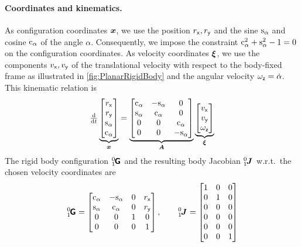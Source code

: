 \paragraph{Coordinates and kinematics.}
As configuration coordinates $\boldsymbol{x}$, we use the position $r_{\mathsf{x}},r_{\mathsf{y}}$ and the sine $\mathrm{s}_{\alpha}$ and cosine $\mathrm{c}_{\alpha}$ of the angle $\alpha$.
Consequently, we impose the constraint $\mathrm{c}_{\alpha}^2+\mathrm{s}_{\alpha}^2-1 = 0$ on the configuration coordinates.
As velocity coordinates $\boldsymbol{\xi}$, we use the components $v_{\mathsf{x}}, v_{\mathsf{y}}$ of the translational velocity with respect to the body-fixed frame as illustrated in \autoref{fig:PlanarRigidBody} and the angular velocity $\omega_{\mathsf{z}}=\dot{\alpha}$.
This kinematic relation is
\begin{align}
 \tfrac{\mathrm{d}}{\mathrm{d} t}
 \underbrace{\begin{bmatrix} r_{\mathsf{x}} \\ r_{\mathsf{y}} \\ \mathrm{s}_{\alpha} \\ \mathrm{c}_{\alpha} \end{bmatrix}}_{\boldsymbol{x}}
 = 
 \underbrace{\begin{bmatrix} \mathrm{c}_{\alpha} & -\mathrm{s}_{\alpha} & 0 \\ \mathrm{s}_{\alpha} & \mathrm{c}_{\alpha} & 0 \\ 0 & 0 & \mathrm{c}_{\alpha} \\ 0 & 0 & -\mathrm{s}_{\alpha} \end{bmatrix}}_{\boldsymbol{A}}
 \underbrace{\begin{bmatrix} v_{\mathsf{x}} \\ v_{\mathsf{y}} \\ \omega_{\mathsf{z}} \end{bmatrix}}_{\boldsymbol{\xi}}
\end{align}
The rigid body configuration $\bodyHomoCoord{0}{1}$ and the resulting body Jacobian $\bodyJac{0}{1}$ w.r.t.\ the chosen velocity coordinates are
\begin{align}
 \bodyHomoCoord{0}{1} = \begin{bmatrix} \ca & -\sa & 0 & \rx \\ \sa & \ca & 0 & \ry \\ 0 & 0 & 1 & 0 \\ 0 & 0 & 0 & 1 \end{bmatrix},
\qquad
 \bodyJac{0}{1} = \begin{bmatrix} 1 & 0 & 0 \\ 0 & 1 & 0 \\ 0 & 0 & 0 \\ 0 & 0 & 0 \\ 0 & 0 & 0 \\ 0 & 0 & 1 \end{bmatrix}
\end{align}

